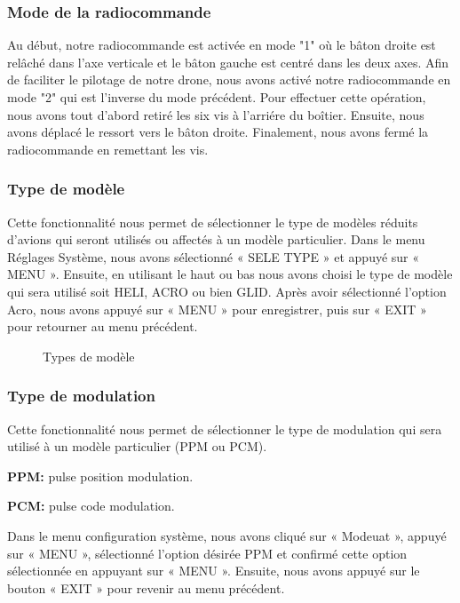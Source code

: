 	\subsubsection{Mode de la radiocommande}
	Au début, notre radiocommande est activée en mode "1" où le bâton droite est relâché dans l'axe verticale et le bâton gauche est centré dans les deux axes. Afin de faciliter le pilotage de notre drone, nous avons activé notre radiocommande en mode "2" qui est l'inverse du mode précédent. Pour effectuer cette opération, nous avons tout d'abord retiré les six vis à l'arriére du boîtier. Ensuite, nous avons déplacé le ressort vers le bâton droite. Finalement, nous avons fermé la radiocommande en remettant les vis.
	
	
	\subsubsection{Type de modèle}
	Cette fonctionnalité nous permet de sélectionner le type de modèles réduits d'avions qui seront utilisés ou affectés à un modèle particulier.
	Dans le menu Réglages Système, nous avons sélectionné « SELE TYPE » et appuyé sur « MENU ». Ensuite, en utilisant le haut ou bas nous avons choisi le type de modèle qui sera utilisé soit HELI, ACRO ou bien GLID. Après avoir sélectionné l'option Acro, nous avons appuyé sur « MENU  » pour enregistrer, puis sur « EXIT » pour retourner au menu précédent.
	
	\begin{figure}[H]
		\begin{center}
			\centering
		\end{center}
		\caption{Types de modèle}
	\end{figure}
	\subsubsection{ Type de modulation}
	Cette fonctionnalité nous permet de sélectionner le type de modulation qui sera utilisé à un modèle particulier (PPM ou PCM).
	
	
	\textbf{PPM:} pulse position modulation. 
	
	\textbf{PCM:} pulse code modulation.
	
	
	Dans le menu configuration système, nous avons cliqué sur « Modeuat », appuyé sur « MENU », sélectionné l'option désirée PPM et confirmé cette option sélectionnée en appuyant sur « MENU ». Ensuite, nous avons appuyé sur le bouton « EXIT » pour revenir au menu précédent.
	
